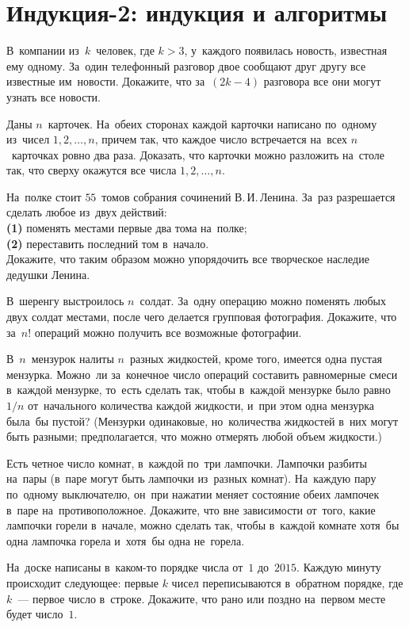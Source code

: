 
\section*{Индукция-2: индукция и алгоритмы}


\begin{problems}

\item
В~компании из~$k$~человек, где $k > 3$, у~каждого появилась новость, известная
ему одному.
За~один телефонный разговор двое сообщают друг другу все известные им~новости.
Докажите, что за~$(2 k - 4)$ разговора все они могут узнать все новости.

\item
Даны $n$~карточек.
На~обеих сторонах каждой карточки написано по~одному из~чисел
$1, 2, \ldots, n$, причем так, что каждое число встречается на~всех
$n$~карточках ровно два раза.
Доказать, что карточки можно разложить на~столе так, что сверху окажутся все
числа $1, 2, \ldots, n$.

\item
На~полке стоит $55$~томов собрания сочинений В.\,И.\,Ленина.
За~раз разрешается сделать любое из~двух действий:
\\
\textbf{(1)} поменять местами первые два тома на~полке;
\\
\textbf{(2)} переставить последний том в~начало.
\\
Докажите, что таким образом можно упорядочить все творческое наследие дедушки
Ленина.

\item
В~шеренгу выстроилось $n$~солдат.
За~одну операцию можно поменять любых двух солдат местами, после чего делается
групповая фотография.
Докажите, что за~$n!$ операций можно получить все возможные фотографии.

\item
В~$n$~мензурок налиты $n$~разных жидкостей, кроме того, имеется одна пустая
мензурка.
Можно~ли за~конечное число операций составить равномерные смеси в~каждой
мензурке, то~есть сделать так, чтобы в~каждой мензурке было равно $1 / n$
от~начального количества каждой жидкости, и~при этом одна мензурка была~бы
пустой?
(Мензурки одинаковые, но~количества жидкостей в~них могут быть разными;
предполагается, что можно отмерять любой объем жидкости.)

\item
Есть четное число комнат, в~каждой по~три лампочки.
Лампочки разбиты на~пары (в~паре могут быть лампочки из~разных комнат).
На~каждую пару по~одному выключателю, он~при нажатии меняет состояние обеих
лампочек в~паре на~противоположное.
Докажите, что вне зависимости от~того, какие лампочки горели в~начале, можно
сделать так, чтобы в~каждой комнате хотя~бы одна лампочка горела и~хотя~бы одна
не~горела.

\item
На~доске написаны в~каком-то порядке числа от~$1$ до~$2015$.
Каждую минуту происходит следующее: первые $k$ чисел переписываются в~обратном
порядке, где $k$~--- первое число в~строке.
Докажите, что рано или поздно на~первом месте будет число~$1$.

\end{problems}

